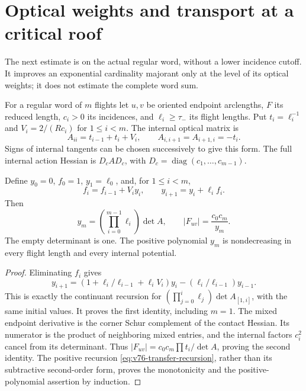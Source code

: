 \section{Optical weights and transport at a critical roof}
\label{sec:v76-optical}
The next estimate is on the actual regular word, without a lower
incidence cutoff. It improves an exponential cardinality majorant
only at the level of its optical weights; it does not estimate the
complete word sum.

For a regular word of $m$ flights let $u,v$ be oriented endpoint
arclengths, $F$ its reduced length, $c_i>0$ its incidences, and
$\ell_i\ge\tau_-$ its flight lengths. Put $t_i=\ell_i^{-1}$ and
$V_i=2/(Rc_i)$ for $1\le i<m$. The internal optical matrix is
\begin{equation}\label{eq:v76-optical-matrix}
 A_{ii}=t_{i-1}+t_i+V_i,\qquad A_{i,i+1}=A_{i+1,i}=-t_i.
\end{equation}
Signs of internal tangents can be chosen successively to give this
form. The full internal action Hessian is $D_cAD_c$, with
$D_c=\operatorname{diag}(c_1,\ldots,c_{m-1})$.

\begin{lemma}
\label{lem:v76-transfer}
Define $y_0=0$, $f_0=1$, $y_1=\ell_0$, and, for $1\le i<m$,
\begin{equation}\label{eq:v76-transfer-recursion}
 f_i=f_{i-1}+V_i y_i,\qquad y_{i+1}=y_i+\ell_i f_i.
\end{equation}
Then
\begin{equation}\label{eq:v76-denominator}
 y_m=\left(\prod_{i=0}^{m-1}\ell_i\right)\det A,
 \qquad |F_{uv}|=\frac{c_0c_m}{y_m}.
\end{equation}
The empty determinant is one. The positive polynomial $y_m$ is
nondecreasing in every flight length and every internal potential.
\end{lemma}
\begin{proof}
Eliminating $f_i$ gives
\[
 y_{i+1}=(1+\ell_i/\ell_{i-1}+\ell_iV_i)y_i
                              -(\ell_i/\ell_{i-1})y_{i-1}.
\]
This is exactly the continuant recursion for
$(\prod_{j=0}^{i}\ell_j)\det A_{[1,i]}$, with the same initial
values. It proves the first identity, including $m=1$.
The mixed endpoint derivative is the corner Schur complement of
the contact Hessian. Its numerator is the product of neighboring
mixed entries, and the internal factors $c_i^2$ cancel from its
determinant. Thus
$|F_{uv}|=c_0c_m\prod t_i/\det A$, proving the second identity.
The positive recursion \eqref{eq:v76-transfer-recursion}, rather
than its subtractive second-order form, proves the monotonicity
and the positive-polynomial assertion by induction.
\end{proof}

